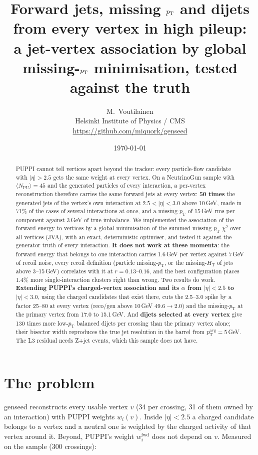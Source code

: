 \documentclass[11pt,a4paper]{article}
\title{Forward jets, missing $\pt$ and dijets from every vertex in high pileup:\\
\large a jet-vertex association by global missing-$\pt$ minimisation, tested against the truth}
\author{M.~Voutilainen \\ \small Helsinki Institute of Physics / CMS \\ \small \url{https://github.com/miquork/genseed}}
\date{\today}
\newcommand{\pt}{p_{\mathrm{T}}}
\newcommand{\hl}[1]{\textcolor{good}{\textbf{#1}}}
\newcommand{\nul}[1]{\textcolor{bad}{\textbf{#1}}}
\begin{document}
\maketitle

\begin{abstract}
\noindent
PUPPI cannot tell vertices apart beyond the tracker: every particle-flow
candidate with $|\eta|>2.5$ gets the same weight at every vertex. On a
NeutrinoGun sample with $\langle N_{\mathrm{PU}}\rangle = 45$ and the generated
particles of every interaction, a per-vertex reconstruction therefore carries
the same forward jets at every vertex: \nul{50 times} the generated jets of the
vertex's own interaction at $2.5<|\eta|<3.0$ above 10\,GeV, made in 71\% of the
cases of several interactions at once, and a missing-$\pt$ of 15\,GeV rms per
component against 3\,GeV of true imbalance. We implemented the association of
the forward energy to vertices by a global minimisation of the summed
missing-$\pt$ $\chi^2$ over all vertices (JVA), with an exact, deterministic
optimiser, and tested it against the generator truth of every interaction.
\nul{It does not work at these momenta}: the forward energy that belongs to one
interaction carries 1.6\,GeV per vertex against 7\,GeV of recoil noise, every
recoil definition (particle missing-$\pt$, or the missing-$H_{\mathrm{T}}$ of
jets above 3--15\,GeV) correlates with it at $r = 0.13$--$0.16$, and the best
configuration places 1.4\% more single-interaction clusters right than wrong.
Two results do work. \hl{Extending PUPPI's charged-vertex association and its
$\alpha$ from $|\eta|<2.5$ to $|\eta|<3.0$}, using the charged candidates that
exist there, cuts the 2.5--3.0 spike by a factor 25--80 at every vertex
(reco/gen above 10\,GeV $49.6 \to 2.0$) and the missing-$\pt$ at the primary
vertex from 17.0 to 15.1\,GeV. And \hl{dijets selected at every vertex} give 130
times more low-$\pt$ balanced dijets per crossing than the primary vertex alone;
their bisector width reproduces the true jet resolution in the barrel from
$\pt^{\mathrm{avg}} = 5$\,GeV. The L3 residual needs Z+jet events, which this
sample does not have.
\end{abstract}

\section{The problem}

genseed reconstructs every usable vertex $v$ (34 per crossing, 31 of them owned
by an interaction) with PUPPI weights $w_i(v)$. Inside $|\eta|<2.5$ a charged
candidate belongs to a vertex and a neutral one is weighted by the charged
activity of that vertex around it. Beyond, PUPPI's weight $w^{\mathrm{fwd}}_i$
does not depend on $v$. Measured on the sample (300 crossings):
\end{document}
